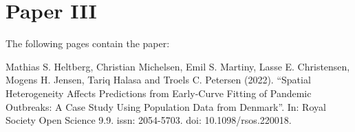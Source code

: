\chapter{Paper III}
\label{chapter:covid19-agent-based-model}

The following pages contain the paper:
\vspace*{1cm}


Mathias S. Heltberg, Christian Michelsen, Emil S. Martiny, Lasse E. Christensen, Mogens H. Jensen, Tariq Halasa and Troels C. Petersen (2022). ``Spatial Heterogeneity Affects Predictions from Early-Curve Fitting of Pandemic Outbreaks: A Case Study Using Population Data from Denmark''. In: Royal Society Open Science 9.9. issn: 2054-5703. doi: 10.1098/rsos.220018.

% 
